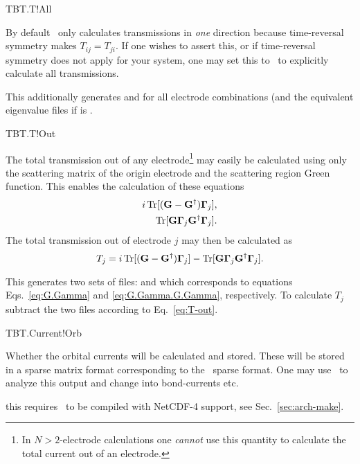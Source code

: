 \begin{fdflogicalF}{TBT.T!All}

  By default \tbtrans\ only calculates transmissions in \emph{one}
  direction because time-reversal symmetry makes $T_{ij}=T_{ji}$. If
  one wishes to assert this, or if time-reversal symmetry does not
  apply for your system, one may set this to \fdftrue\ to explicitly
  calculate all transmissions.

  This additionally generates  and
   for all electrode combinations (and the
  equivalent eigenvalue files if  is \fdftrue.

\end{fdflogicalF}

\begin{fdflogicalF}{TBT.T!Out}
  
  The total transmission out of any electrode\footnote{In
      $N>2$-electrode calculations one \emph{cannot} use this quantity
      to calculate the total current out of an electrode.} may easily
  be calculated using only the scattering matrix of the origin
  electrode and the scattering region Green function.
  This enables the calculation of these equations
  \begin{align}
    i\operatorname{Tr}[(\mathbf G - \mathbf G^\dagger)\boldsymbol \Gamma_j],
    \label{eq:G.Gamma}
    \\
    \operatorname{Tr}[\mathbf G \boldsymbol \Gamma_j \mathbf G^\dagger\boldsymbol
    \Gamma_j].
    \label{eq:G.Gamma.G.Gamma}
  \end{align}
  The total transmission out of electrode $j$ may then be calculated
  as
  \begin{equation}
    \label{eq:T-out}
    T_j = i\operatorname{Tr}[(\mathbf G - \mathbf G^\dagger)\boldsymbol \Gamma_j] 
    -
    \operatorname{Tr}[\mathbf G \boldsymbol \Gamma_j \mathbf G^\dagger\boldsymbol \Gamma_j].
  \end{equation}

  This generates two sets of files:  and
   which corresponds to equations
  Eqs.~\eqref{eq:G.Gamma} and \eqref{eq:G.Gamma.G.Gamma},
  respectively. To calculate $T_j$ subtract the two files
  according to Eq.~\eqref{eq:T-out}.
  
\end{fdflogicalF}

\begin{fdflogicalF}{TBT.Current!Orb}

  Whether the orbital currents will be calculated and stored.  These
  will be stored in a sparse matrix format corresponding to the
  \siesta\ sparse format.
  One may use \sisl\ to analyze this output and change into
  bond-currents etc.

  \note this requires \tbtrans\ to be compiled with NetCDF-4 support,
  see Sec.~\ref{sec:arch-make}.
  
\end{fdflogicalF}

